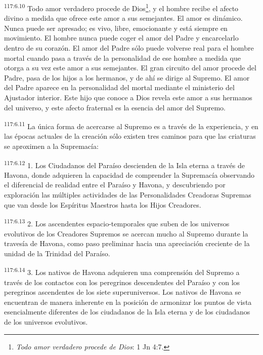 \par
\textsuperscript{117:6.10} Todo amor verdadero procede de Dios\footnote{\textit{Todo amor verdadero procede de Dios}: 1 Jn 4:7.}, y el hombre recibe el afecto divino a medida que ofrece este amor a sus semejantes. El amor es dinámico. Nunca puede ser apresado; es vivo, libre, emocionante y está siempre en movimiento. El hombre nunca puede coger el amor del Padre y encarcelarlo dentro de su corazón. El amor del Padre sólo puede volverse real para el hombre mortal cuando pasa a través de la personalidad de ese hombre a medida que otorga a su vez este amor a sus semejantes. El gran circuito del amor procede del Padre, pasa de los hijos a los hermanos, y de ahí se dirige al Supremo. El amor del Padre aparece en la personalidad del mortal mediante el ministerio del Ajustador interior. Este hijo que conoce a Dios revela este amor a sus hermanos del universo, y este afecto fraternal es la esencia del amor del Supremo.

\par
\textsuperscript{117:6.11} La única forma de acercarse al Supremo es a través de la experiencia, y en las épocas actuales de la creación sólo existen tres caminos para que las criaturas se aproximen a la Supremacía:

\par
\textsuperscript{117:6.12} 1. Los Ciudadanos del Paraíso descienden de la Isla eterna a través de Havona, donde adquieren la capacidad de comprender la Supremacía observando el diferencial de realidad entre el Paraíso y Havona, y descubriendo por exploración las múltiples actividades de las Personalidades Creadoras Supremas que van desde los Espíritus Maestros hasta los Hijos Creadores.

\par
\textsuperscript{117:6.13} 2. Los ascendentes espacio-temporales que suben de los universos evolutivos de los Creadores Supremos se acercan mucho al Supremo durante la travesía de Havona, como paso preliminar hacia una apreciación creciente de la unidad de la Trinidad del Paraíso.

\par
\textsuperscript{117:6.14} 3. Los nativos de Havona adquieren una comprensión del Supremo a través de los contactos con los peregrinos descendentes del Paraíso y con los peregrinos ascendentes de los siete superuniversos. Los nativos de Havona se encuentran de manera inherente en la posición de armonizar los puntos de vista esencialmente diferentes de los ciudadanos de la Isla eterna y de los ciudadanos de los universos evolutivos.


